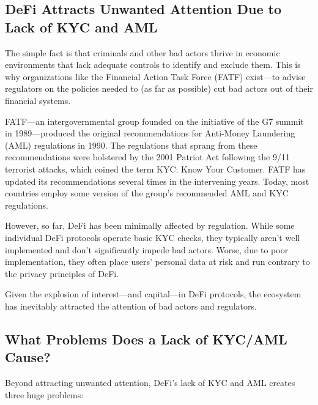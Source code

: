 \subsection{DeFi Attracts Unwanted Attention Due to Lack of KYC and AML}

The simple fact is that criminals and other bad actors thrive in economic environments that lack adequate controls to identify and exclude them. This is why organizations like the Financial Action Task Force (FATF) exist—to advise regulators on the policies needed to (as far as possible) cut bad actors out of their financial systems.

FATF—an intergovernmental group founded on the initiative of the G7 summit in 1989—produced the original recommendations for Anti-Money Laundering (AML) regulations in 1990. The regulations that sprang from these recommendations were bolstered by the 2001 Patriot Act following the 9/11 terrorist attacks, which coined the term KYC: Know Your Customer. FATF has updated its recommendations several times in the intervening years. Today, most countries employ some version of the group’s recommended AML and KYC regulations.

However, so far, DeFi has been minimally affected by regulation. While some individual DeFi protocols operate basic KYC checks, they typically aren’t well implemented and don’t significantly impede bad actors. Worse, due to poor implementation, they often place users’ personal data at risk and run contrary to the privacy principles of DeFi.

Given the explosion of interest—and capital—in DeFi protocols, the ecosystem has inevitably attracted the attention of bad actors and regulators.

\subsection{What Problems Does a Lack of KYC/AML Cause?}
Beyond attracting unwanted attention, DeFi’s lack of KYC and AML creates three huge problems:

